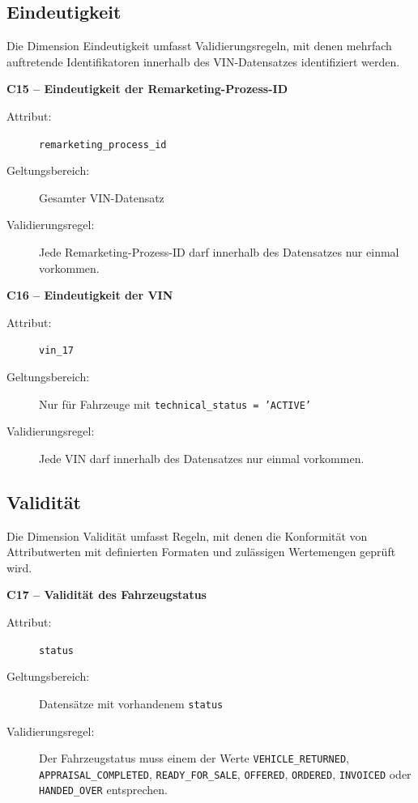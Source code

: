 \documentclass[../main.tex]{subfiles}
\begin{document}
\subsection{Eindeutigkeit} 
\label{sec:validierungsregeln-eindeutigkeit} 

Die Dimension Eindeutigkeit umfasst Validierungsregeln, mit denen mehrfach auftretende Identifikatoren innerhalb des VIN-Datensatzes identifiziert werden. 

\medskip 
\noindent\textbf{C15 -- Eindeutigkeit der Remarketing-Prozess-ID} 
\begin{description}  
    \item[Attribut:] \texttt{remarketing\_process\_id} 
    \item[Geltungsbereich:] Gesamter VIN-Datensatz 
    \item[Validierungsregel:] Jede Remarketing-Prozess-ID darf innerhalb des Datensatzes nur einmal vorkommen.
\end{description} 

\medskip 
\noindent\textbf{C16 -- Eindeutigkeit der VIN} 
\begin{description} 
    \item[Attribut:] \texttt{vin\_17} 
    \item[Geltungsbereich:] Nur für Fahrzeuge mit \texttt{technical\_status = 'ACTIVE'} 
    \item[Validierungsregel:] Jede VIN darf innerhalb des Datensatzes nur einmal vorkommen. 
\end{description} 

\subsection{Validität} 
\label{sec:validierungsregeln-validitaet} 

Die Dimension Validität umfasst Regeln, mit denen die Konformität von Attributwerten mit definierten Formaten und zulässigen Wertemengen geprüft wird. 

\medskip 
\noindent\textbf{C17 -- Validität des Fahrzeugstatus} 
\begin{description}  
    \item[Attribut:] \texttt{status} 
    \item[Geltungsbereich:] Datensätze mit vorhandenem \texttt{status} 
    \item[Validierungsregel:] Der Fahrzeugstatus muss einem der Werte \texttt{VEHICLE\_RETURNED}, \\ \texttt{APPRAISAL\_COMPLETED}, \texttt{READY\_FOR\_SALE}, \texttt{OFFERED}, \texttt{ORDERED}, \texttt{INVOICED} oder \texttt{HANDED\_OVER} entsprechen. 
\end{description} 
\end{document}

